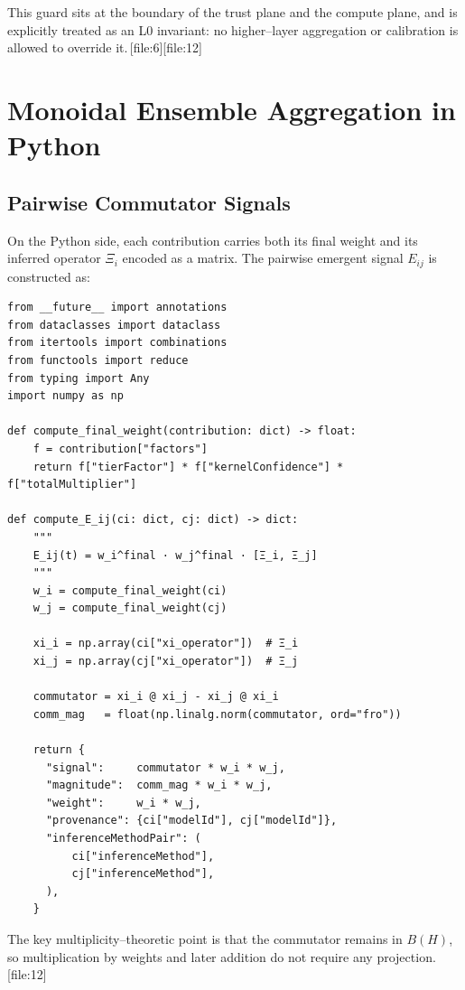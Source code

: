 \documentclass[11pt]{article}
\begin{document}
This guard sits at the boundary of the trust plane and the compute plane, and
is explicitly treated as an L0 invariant: no higher--layer aggregation or
calibration is allowed to override it.\,[file:6][file:12]

\section{Monoidal Ensemble Aggregation in Python}

\subsection{Pairwise Commutator Signals}

On the Python side, each contribution carries both its final weight and its
inferred operator \(\Xi_i\) encoded as a matrix. The pairwise emergent signal
\(E_{ij}\) is constructed as:

\begin{lstlisting}[language=Python3,caption={Pairwise emergent signal \(E_{ij}\).}]
from __future__ import annotations
from dataclasses import dataclass
from itertools import combinations
from functools import reduce
from typing import Any
import numpy as np

def compute_final_weight(contribution: dict) -> float:
    f = contribution["factors"]
    return f["tierFactor"] * f["kernelConfidence"] * f["totalMultiplier"]

def compute_E_ij(ci: dict, cj: dict) -> dict:
    """
    E_ij(t) = w_i^final · w_j^final · [Ξ_i, Ξ_j]
    """
    w_i = compute_final_weight(ci)
    w_j = compute_final_weight(cj)

    xi_i = np.array(ci["xi_operator"])  # Ξ_i
    xi_j = np.array(cj["xi_operator"])  # Ξ_j

    commutator = xi_i @ xi_j - xi_j @ xi_i
    comm_mag   = float(np.linalg.norm(commutator, ord="fro"))

    return {
      "signal":     commutator * w_i * w_j,
      "magnitude":  comm_mag * w_i * w_j,
      "weight":     w_i * w_j,
      "provenance": {ci["modelId"], cj["modelId"]},
      "inferenceMethodPair": (
          ci["inferenceMethod"],
          cj["inferenceMethod"],
      ),
    }
\end{lstlisting}

The key multiplicity--theoretic point is that the commutator remains in
\(B(H)\), so multiplication by weights and later addition do not require any
projection.\,[file:12]
\end{document}
